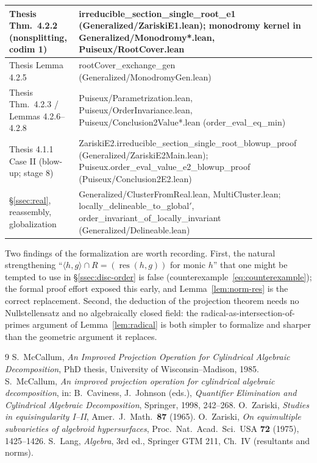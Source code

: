 \documentclass[11pt,a4paper]{article}
\theoremstyle{plain}
\theoremstyle{definition}
\DeclareMathOperator{\res}{res}
\newcommand{\ideal}[1]{\langle #1\rangle}
\newcommand{\code}[1]{{\ttfamily\small #1}}
\begin{document}
\begin{center}
\begin{tabular}{|p{6.0cm}|p{8.4cm}|}
\hline
Thesis Thm.~4.2.2 (nonsplitting, codim 1) &
\code{irreducible\_section\_single\_root\_e1} (\code{Generalized/ZariskiE1.lean});
monodromy kernel in \code{Generalized/Monodromy*.lean},
\code{Puiseux/RootCover.lean} \\
\hline
Thesis Lemma 4.2.5 &
\code{rootCover\_exchange\_gen} (\code{Generalized/MonodromyGen.lean}) \\
\hline
Thesis Thm.~4.2.3 / Lemmas 4.2.6--4.2.8 &
\code{Puiseux/Parametrization.lean}, \code{Puiseux/OrderInvariance.lean},
\code{Puiseux/Conclusion2Value*.lean} (\code{order\_eval\_eq\_min}) \\
\hline
Thesis 4.1.1 Case II (blow-up; stage 8) &
\code{ZariskiE2.irreducible\_section\_single\_root\_blowup\_proof}
(\code{Generalized/ZariskiE2Main.lean});
\code{Puiseux.order\_eval\_value\_e2\_blowup\_proof}
(\code{Puiseux/Conclusion2E2.lean}) \\
\hline
\S\ref{ssec:real}, reassembly, globalization &
\code{Generalized/ClusterFromReal.lean}, \code{MultiCluster.lean};
\code{locally\_delineable\_to\_global$'$},
\code{order\_invariant\_of\_locally\_invariant}
(\code{Generalized/Delineable.lean}) \\
\hline
\end{tabular}
\end{center}

Two findings of the formalization are worth recording. First, the natural
strengthening ``$\ideal{h,g}\cap R=(\res(h,g))$ for monic $h$'' that one might
be tempted to use in \S\ref{ssec:disc-order} is false
(counterexample~\eqref{eq:counterexample}); the formal proof effort exposed
this early, and Lemma~\ref{lem:norm-res} is the correct replacement. Second,
the deduction of the projection theorem needs no Nullstellensatz and no
algebraically closed field: the radical-as-intersection-of-primes argument of
Lemma~\ref{lem:radical} is both simpler to formalize and sharper than the
geometric argument it replaces.

\begin{thebibliography}{9}
 S.~McCallum,
  \emph{An Improved Projection Operation for Cylindrical Algebraic
  Decomposition}, PhD thesis, University of Wisconsin--Madison, 1985.
 S.~McCallum,
  \emph{An improved projection operation for cylindrical algebraic
  decomposition}, in: B.~Caviness, J.~Johnson (eds.), \emph{Quantifier
  Elimination and Cylindrical Algebraic Decomposition}, Springer, 1998,
  242--268.
 O.~Zariski, \emph{Studies in equisingularity I--II},
  Amer.\ J.\ Math.\ \textbf{87} (1965).
 O.~Zariski,
  \emph{On equimultiple subvarieties of algebroid hypersurfaces},
  Proc.\ Nat.\ Acad.\ Sci.\ USA \textbf{72} (1975), 1425--1426.
 S.~Lang, \emph{Algebra}, 3rd ed., Springer GTM 211, Ch.~IV
  (resultants and norms).
\end{thebibliography}
\end{document}

